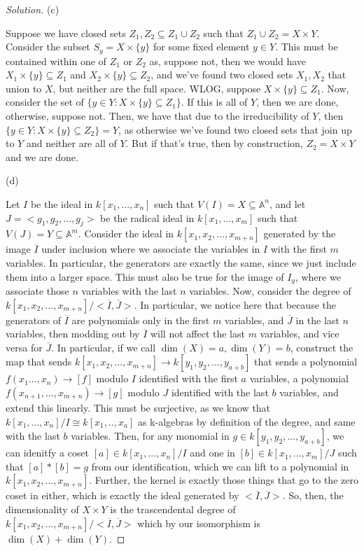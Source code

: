 \documentclass[10pt]{article}
\begin{document}
\begin{proof}[Solution]
(c)

Suppose we have closed sets $Z_1, Z_2 \subseteq  Z_1 \cup Z_2$ such that $Z_1 \cup Z_2 = X \times Y$. Consider the subset $S_y = X \times \{ y \}$ for some fixed element $y \in Y$. This must be contained within one of $Z_1$ or $Z_2$ as, suppose not, then we would have $X_1 \times \{y\} \subseteq Z_1$ and $X_2 \times \{y\} \subseteq Z_2$, and we've found two closed sets $X_1, X_2$ that union to $X$, but neither are the full space. WLOG, suppose $X \times \{y \} \subseteq Z_1$. Now, consider the set of $\{ y \in Y : X \times \{ y \} \subseteq Z_1\}$. If this is all of $Y$, then we are done, otherwise, suppose not. Then, we have that due to the irreducibility of $Y$, then $\{ y \in Y : X \times \{ y \} \subseteq Z_2\} = Y$, as otherwise we've found two closed sets that join up to $Y$ and neither are all of $Y$. But if that's true, then by construction, $Z_2  = X \times Y$ and we are done.

(d)

Let $I$ be the ideal in $k[x_1,...,x_n]$ such that $V(I) = X  \subseteq \mathbb{A}^n$, and let $J = < g_1,g_2,...,g_j>$ be the radical ideal in $k[x_1,...,x_m]$ such that $V(J) = Y \subseteq \mathbb{A}^m$. Consider the ideal in $k[x_1,x_2,...,x_{m+n}]$ generated by the image $\overline{I}$ under inclusion where we associate the variables in $I$ with the first $m$ variables. In particular, the generators are exactly the same, since we just include them into a larger space. This must also be true for the image of $I_y$, where we associate those $n$ variables with the last $n$ variables. Now, consider the degree of $k[x_1,x_2,...,x_{m+n}]/<\overline{I}, \overline{J}>$. In particular, we notice here that because the generators of $\overline{I}$ are polynomials only in the first $m$ variables, and $\overline{J}$ in the last $n$ variables, then modding out by $\overline{I}$ will not affect the last $m$ variables, and vice versa for $\overline{J}$. In particular, if we call $\dim(X) = a, \dim(Y) = b$, construct the map that sends $k[x_1,x_2,...,x_{m+n}] \to k[y_1,y_2,...,y_{a+b}]$ that sends a polynomial $f(x_1...,x_n) \to [f]$ modulo $I$ identified with the first $a$ variables, a polynomial $f(x_{n+1},...,x_{m+n}) \to [g]$ modulo $J$ identified with the last $b$ variables, and extend this linearly. This must be surjective, as we know that $k[x_1,...,x_n]/I \cong k[x_1,..,x_a]$ as k-algebras by definition of the degree, and same with the last $b$ variables. Then, for any monomial in $g \in  k[y_1,y_2,...,y_{a+b}]$, we can idenitfy a coset $[a] \in k[x_1,...,x_n]/I$ and one in $[b] \in k[x_1,...,x_m]/J$ such that $[a]*[b] = g$ from our identification, which we can lift to a polynomial in $k[x_1,x_2,...,x_{m+n}]$. Further, the kernel is exactly those things that go to the zero coset in either, which is exactly the ideal generated by $<\overline{I}, \overline{J}>$. So, then, the dimensionality of $X \times Y$ is the trascendental degree of $k[x_1,x_2,...,x_{m+n}]/<\overline{I}, \overline{J}>$ which by our isomorphism is $\dim(X) + \dim(Y)$.

\end{proof}
\end{document}
